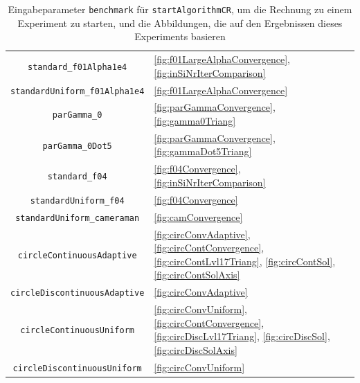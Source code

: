 \begin{table}[p]
\begin{tabular}{c|p{8.7cm}}
    \texttt{standard\_f01Alpha1e4} &
    \ref{fig:f01LargeAlphaConvergence}, \ref{fig:inSiNrIterComparison}\\
    \texttt{standardUniform\_f01Alpha1e4} &
    \ref{fig:f01LargeAlphaConvergence}\\
    \texttt{parGamma\_0} &
    \ref{fig:parGammaConvergence}, \ref{fig:gamma0Triang}\\
    \texttt{parGamma\_0Dot5} &
    \ref{fig:parGammaConvergence}, \ref{fig:gammaDot5Triang}\\
    \texttt{standard\_f04} &
    \ref{fig:f04Convergence}, \ref{fig:inSiNrIterComparison}\\
    \texttt{standardUniform\_f04} &
    \ref{fig:f04Convergence}\\
    \texttt{standardUniform\_cameraman} &
    \ref{fig:camConvergence}\\
    \texttt{circleContinuousAdaptive} &
    \ref{fig:circConvAdaptive}, \ref{fig:circContConvergence},
    \ref{fig:circContLvl17Triang}, %
    \ref{fig:circContSol}, \ref{fig:circContSolAxis}\\
    \texttt{circleDiscontinuousAdaptive} &
    \ref{fig:circConvAdaptive}\\
    \texttt{circleContinuousUniform} &
    \ref{fig:circConvUniform}, \ref{fig:circContConvergence},
    \ref{fig:circDiscLvl17Triang}, %
    \ref{fig:circDiscSol}, \ref{fig:circDiscSolAxis}\\
    \texttt{circleDiscontinuousUniform} &
    \ref{fig:circConvUniform}\\
    \hline
  \end{tabular}
  \caption{Eingabeparameter \texttt{benchmark} für \texttt{startAlgorithmCR},
    um die Rechnung zu einem Experiment zu starten, und die Abbildungen, die
    auf den Ergebnissen dieses Experiments basieren} 
  \label{tab:usedBenchmarks}
\end{table} 

